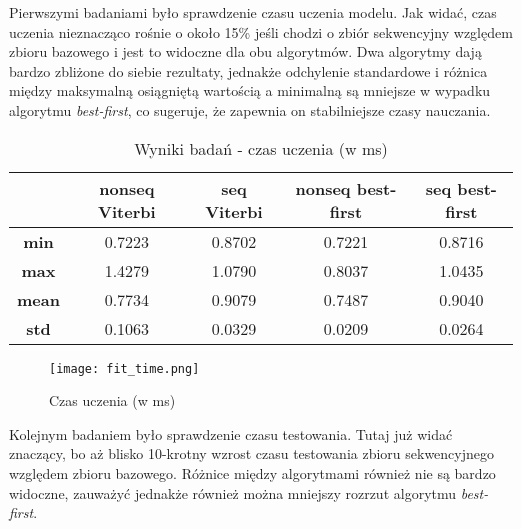 \newpage

Pierwszymi badaniami było sprawdzenie czasu uczenia modelu. Jak widać, czas uczenia nieznacząco rośnie o około 15\% jeśli chodzi o zbiór sekwencyjny względem zbioru bazowego i jest to widoczne dla obu algorytmów. Dwa algorytmy dają bardzo zbliżone do siebie rezultaty, jednakże odchylenie standardowe i różnica między maksymalną osiągniętą wartością a minimalną są mniejsze w wypadku algorytmu \textit{best-first}, co sugeruje, że zapewnia on stabilniejsze czasy nauczania.

\begin{table}[ht!]
\centering
\caption{Wyniki badań - czas uczenia (w ms)}
\label{my-label}
\begin{tabular}{|c|c|c|c|c|}
\hline
\textbf{}     & \textbf{nonseq Viterbi} & \textbf{seq Viterbi} & \textbf{nonseq best-first} & \textbf{seq best-first} \\ \hline
\textbf{min}  & 0.7223                  & 0.8702               & 0.7221                     & 0.8716                  \\ \hline
\textbf{max}  & 1.4279                  & 1.0790               & 0.8037                     & 1.0435                  \\ \hline
\textbf{mean} & 0.7734                  & 0.9079               & 0.7487                     & 0.9040                  \\ \hline
\textbf{std}  & 0.1063                  & 0.0329               & 0.0209                     & 0.0264                  \\ \hline
\end{tabular}
\end{table}

\begin{figure}[h!]
	\centering
	\texttt{[image: fit\_time.png]}
	\label{fit-time}
	\caption{Czas uczenia (w ms)}
\end{figure}

\newpage

Kolejnym badaniem było sprawdzenie czasu testowania. Tutaj już widać znaczący, bo aż blisko 10-krotny wzrost czasu testowania zbioru sekwencyjnego względem zbioru bazowego. Różnice między algorytmami również nie są bardzo widoczne, zauważyć jednakże również można mniejszy rozrzut algorytmu \textit{best-first}.

